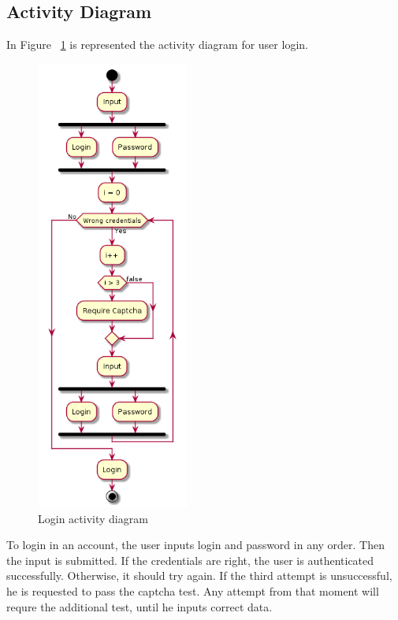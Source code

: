 \documentclass[12pt,a4paper,titlepage]{article}
\begin{document}
\subsection{Activity Diagram}
In Figure ~\ref{fig:7login} is represented the activity diagram for user login.
\begin{figure}[H]
\centering
	\includegraphics[width=5cm]{7login}
	\caption{Login activity diagram}
	\label{fig:7login}
\end{figure}
To login in an account, the user inputs login and password in any order. Then the input is submitted. If the credentials are right, the user is authenticated successfully. Otherwise, it should try again. If the third attempt is unsuccessful, he is requested to pass the captcha test. Any attempt from that moment will requre the additional test, until he inputs correct data.
\end{document}
